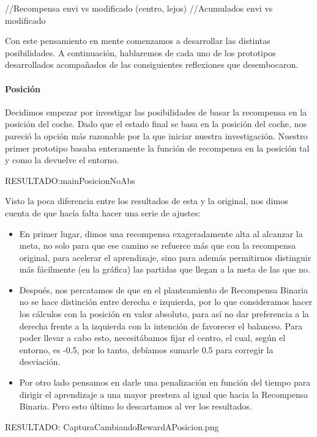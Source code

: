 //Recompensa envi vs modificado (centro, lejos)
//Acumulados envi vs modificado

Con este pensamiento en mente comenzamos a desarrollar las distintas posibilidades. A continuación, hablaremos de cada uno de los prototipos desarrollados acompañados de las consiguientes reflexiones que desembocaron.



\paragraph{Posición}
 Decidimos empezar por investigar las posibilidades de basar la recompensa en la posición del coche.
 Dado que el estado final se basa en la posición del coche, nos pareció la opción más razonable por la que iniciar nuestra investigación. Nuestro primer prototipo basaba enteramente la función de recompensa en la posición tal y como la devuelve el entorno. 

 RESULTADO:mainPosicionNoAbs

Visto la poca diferencia entre los resultados de esta y la original, nos dimos cuenta de que hacía falta hacer una serie de ajustes:

\begin{itemize}
    \item En primer lugar, dimos una recompensa exageradamente alta al alcanzar la meta, no solo para que ese camino se refuerce más que con la recompensa original, para acelerar el aprendizaje, sino para además permitirnos distinguir más fácilmente (en la gráfica) las partidas que llegan a la meta de las que no.  
    \item Después, nos percatamos de que en el planteamiento de Recompensa Binaria no se hace distinción entre derecha e izquierda, por lo que consideramos hacer los cálculos con la posición en valor absoluto, para así no dar preferencia a la derecha frente a la izquierda con la intención de favorecer el balanceo.
     Para poder llevar a cabo esto, necesitábamos fijar el centro, el cual, según el entorno, es -0.5, por lo tanto, debíamos sumarle 0.5 para corregir la desviación.
    \item Por otro lado pensamos en darle una penalización en función del tiempo para dirigir el aprendizaje a una mayor presteza al igual que hacia la Recompensa Binaria. Pero esto último lo descartamos al ver los resultados.
\end{itemize}
 RESULTADO: CapturaCambiandoRewardAPosicion.png

